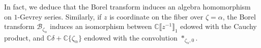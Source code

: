 \documentclass{article}
\newcommand{\C}{\mathbb{C}}
\newcommand{\series}[1]{\tilde{#1}}
\newcommand{\borel}{\mathcal{B}}
\theoremstyle{definition}
\newtheorem{definition}{Definition}[section]
\theoremstyle{plain}
\newtheorem{prop}[definition]{Proposition}
\begin{document}
In fact, we deduce that the Borel transform induces an algebra homomorphism on $1$-Gevrey series. Similarly, if $z$ is coordinate on the fiber over $\zeta=\alpha$, the Borel transform $\borel_{\zeta_\alpha}$ induces an isomorphism between $\C\llbracket z^{-1}\rrbracket_1$ edowed with the Cauchy product, and $\C\delta+\C\{\zeta_\alpha\}$ endowed with the convolution $\ast_{\zeta_\alpha,0}$.  
\end{document}
